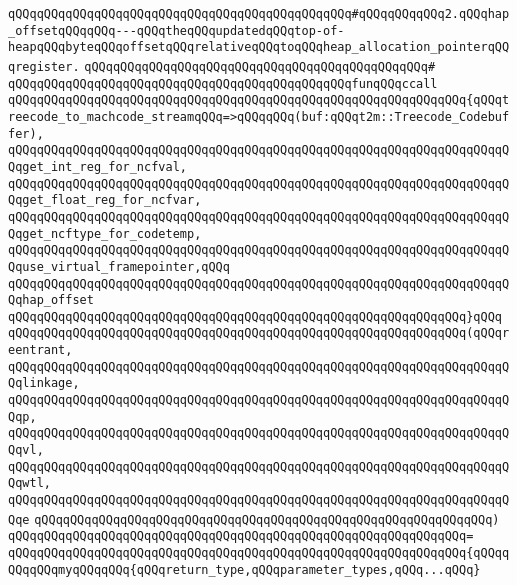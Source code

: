 \verb|qQQqqQQqqQQqqQQqqQQqqQQqqQQqqQQqqQQqqQQqqQQqqQQq#qQQqqQQqqQQq2.qQQqhap_offsetqQQqqQQq---qQQqtheqQQqupdatedqQQqtop-of-heapqQQqbyteqQQqoffsetqQQqrelativeqQQqtoqQQqheap_allocation_pointerqQQqregister.|\newline
\verb|qQQqqQQqqQQqqQQqqQQqqQQqqQQqqQQqqQQqqQQqqQQqqQQq#|\newline
\verb|qQQqqQQqqQQqqQQqqQQqqQQqqQQqqQQqqQQqqQQqqQQqqQQqfunqQQqccall|\newline
\verb|qQQqqQQqqQQqqQQqqQQqqQQqqQQqqQQqqQQqqQQqqQQqqQQqqQQqqQQqqQQqqQQq{qQQqtreecode_to_machcode_streamqQQq=>qQQqqQQq(buf:qQQqt2m::Treecode_Codebuffer),|\newline
\verb|qQQqqQQqqQQqqQQqqQQqqQQqqQQqqQQqqQQqqQQqqQQqqQQqqQQqqQQqqQQqqQQqqQQqqQQqget_int_reg_for_ncfval,|\newline
\verb|qQQqqQQqqQQqqQQqqQQqqQQqqQQqqQQqqQQqqQQqqQQqqQQqqQQqqQQqqQQqqQQqqQQqqQQqget_float_reg_for_ncfvar,|\newline
\verb|qQQqqQQqqQQqqQQqqQQqqQQqqQQqqQQqqQQqqQQqqQQqqQQqqQQqqQQqqQQqqQQqqQQqqQQqget_ncftype_for_codetemp,|\newline
\verb|qQQqqQQqqQQqqQQqqQQqqQQqqQQqqQQqqQQqqQQqqQQqqQQqqQQqqQQqqQQqqQQqqQQqqQQquse_virtual_framepointer,qQQq|\newline
\verb|qQQqqQQqqQQqqQQqqQQqqQQqqQQqqQQqqQQqqQQqqQQqqQQqqQQqqQQqqQQqqQQqqQQqqQQqhap_offset|\newline
\verb|qQQqqQQqqQQqqQQqqQQqqQQqqQQqqQQqqQQqqQQqqQQqqQQqqQQqqQQqqQQqqQQq}qQQq|\newline
\verb|qQQqqQQqqQQqqQQqqQQqqQQqqQQqqQQqqQQqqQQqqQQqqQQqqQQqqQQqqQQqqQQq(qQQqreentrant,|\newline
\verb|qQQqqQQqqQQqqQQqqQQqqQQqqQQqqQQqqQQqqQQqqQQqqQQqqQQqqQQqqQQqqQQqqQQqqQQqlinkage,|\newline
\verb|qQQqqQQqqQQqqQQqqQQqqQQqqQQqqQQqqQQqqQQqqQQqqQQqqQQqqQQqqQQqqQQqqQQqqQQqp,|\newline
\verb|qQQqqQQqqQQqqQQqqQQqqQQqqQQqqQQqqQQqqQQqqQQqqQQqqQQqqQQqqQQqqQQqqQQqqQQqvl,|\newline
\verb|qQQqqQQqqQQqqQQqqQQqqQQqqQQqqQQqqQQqqQQqqQQqqQQqqQQqqQQqqQQqqQQqqQQqqQQqwtl,|\newline
\verb|qQQqqQQqqQQqqQQqqQQqqQQqqQQqqQQqqQQqqQQqqQQqqQQqqQQqqQQqqQQqqQQqqQQqqQQqe|\newline
\verb|qQQqqQQqqQQqqQQqqQQqqQQqqQQqqQQqqQQqqQQqqQQqqQQqqQQqqQQqqQQqqQQq)|\newline
\verb|qQQqqQQqqQQqqQQqqQQqqQQqqQQqqQQqqQQqqQQqqQQqqQQqqQQqqQQqqQQqqQQq=|\newline
\verb|qQQqqQQqqQQqqQQqqQQqqQQqqQQqqQQqqQQqqQQqqQQqqQQqqQQqqQQqqQQqqQQq{qQQqqQQqqQQqmyqQQqqQQq{qQQqreturn_type,qQQqparameter_types,qQQq...qQQq}|\newline
